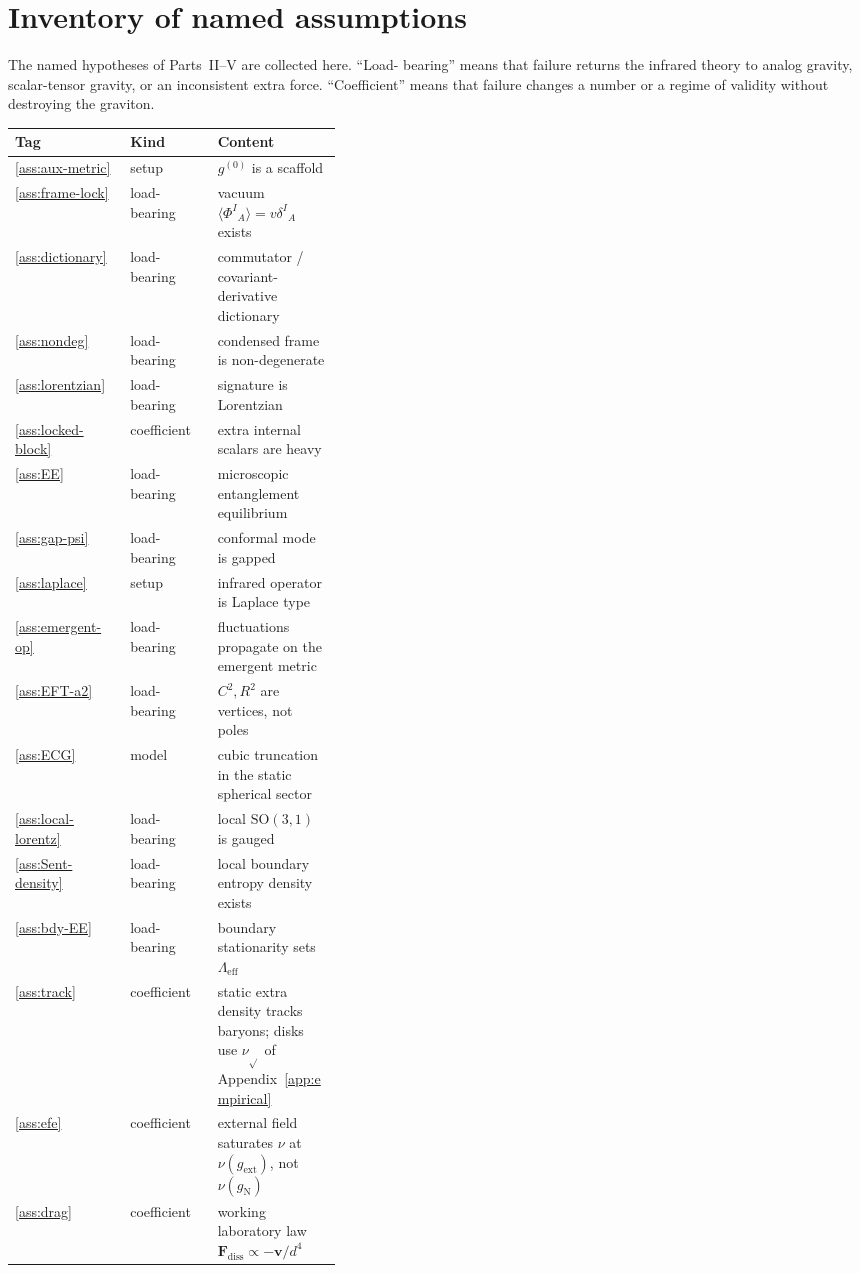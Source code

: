 \section{Inventory of named assumptions}
\label{sec:ch16-inventory}

The named hypotheses of Parts~II--V are collected here. ``Load-
bearing'' means that failure returns the infrared theory to analog
gravity, scalar-tensor gravity, or an inconsistent extra force.
``Coefficient'' means that failure changes a number or a regime of
validity without destroying the graviton.

\begin{center}
\small
\begin{tabular}{@{}llp{0.38\linewidth}@{}}
\toprule
Tag & Kind & Content \\
\midrule
\ref{ass:aux-metric} & setup & \(g^{(0)}\) is a scaffold \\
\ref{ass:frame-lock} & load-bearing & vacuum
  \(\langle\Phi^I{}_A\rangle=v\delta^I{}_A\) exists \\
\ref{ass:dictionary} & load-bearing & commutator / covariant-derivative
  dictionary \\
\ref{ass:nondeg} & load-bearing & condensed frame is non-degenerate \\
\ref{ass:lorentzian} & load-bearing & signature is Lorentzian \\
\ref{ass:locked-block} & coefficient & extra internal scalars are heavy \\
\ref{ass:EE} & load-bearing & microscopic entanglement equilibrium \\
\ref{ass:gap-psi} & load-bearing & conformal mode is gapped \\
\ref{ass:laplace} & setup & infrared operator is Laplace type \\
\ref{ass:emergent-op} & load-bearing & fluctuations propagate on the
  emergent metric \\
\ref{ass:EFT-a2} & load-bearing & \(C^2,R^2\) are vertices, not poles \\
\ref{ass:ECG} & model & cubic truncation in the static spherical
  sector \\
\ref{ass:local-lorentz} & load-bearing & local \(\mathrm{SO}(3,1)\)
  is gauged \\
\ref{ass:Sent-density} & load-bearing & local boundary entropy
  density exists \\
\ref{ass:bdy-EE} & load-bearing & boundary stationarity sets
  \(\Lambda_{\mathrm{eff}}\) \\
\ref{ass:track} & coefficient & static extra density tracks baryons;
  disks use \(\nu_{\sqrt{}}\) of Appendix~\ref{app:empirical} \\
\ref{ass:efe} & coefficient & external field saturates \(\nu\) at \(\nu(g_{\mathrm{ext}})\),
  not \(\nu(g_{\mathrm{N}})\) \\
\ref{ass:drag} & coefficient & working laboratory law
  \(\mathbf{F}_{\mathrm{diss}}\propto -\mathbf{v}/d^4\) \\
\bottomrule
\end{tabular}
\end{center}

